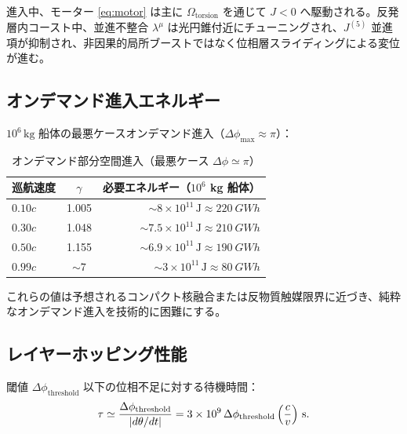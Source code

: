 \documentclass[dvipdfmx,a4paper]{article}
\theoremstyle{definition}
\begin{document}
進入中、モーター \eqref{eq:motor} は主に $\Omega_{\mathrm{torsion}}$ を通じて $J<0$ へ駆動される。反発層内コースト中、並進不整合 $\lambda^\mu$ は光円錐付近にチューニングされ、$J^{(5)}$ 並進項が抑制され、非因果的局所ブーストではなく位相層スライディングによる変位が進む。

\subsection{オンデマンド進入エネルギー}

$10^6\,\mathrm{kg}$ 船体の最悪ケースオンデマンド進入（$\Delta\phi_{\max}\approx\pi$）：

\begin{table}[ht]
\centering
\caption{オンデマンド部分空間進入（最悪ケース $\Delta\phi\simeq\pi$）}
\label{tab:ondemand}
\begin{tabular}{@{}lcr@{}}
\toprule
巡航速度 & $\gamma$ & 必要エネルギー（$10^6$ kg 船体） \\
\midrule
$0.10c$ & 1.005 & $\sim 8\times 10^{11}\,\mathrm{J}\approx\qty{220}{GWh}$ \\
$0.30c$ & 1.048 & $\sim 7.5\times 10^{11}\,\mathrm{J}\approx\qty{210}{GWh}$ \\
$0.50c$ & 1.155 & $\sim 6.9\times 10^{11}\,\mathrm{J}\approx\qty{190}{GWh}$ \\
$0.99c$ & $\sim 7$ & $\sim 3\times 10^{11}\,\mathrm{J}\approx\qty{80}{GWh}$ \\
\bottomrule
\end{tabular}
\end{table}

これらの値は予想されるコンパクト核融合または反物質触媒限界に近づき、純粋なオンデマンド進入を技術的に困難にする。

\subsection{レイヤーホッピング性能}

閾値 $\Delta\phi_{\mathrm{threshold}}$ 以下の位相不足に対する待機時間：
\begin{equation}
\tau \simeq \frac{\Delta\phi_{\mathrm{threshold}}}{|d\theta/dt|}
= 3\times 10^9\,\Delta\phi_{\mathrm{threshold}}\,\Bigl(\frac{c}{v}\Bigr)~\mathrm{s}.
\label{eq:wait}
\end{equation}
\end{document}
